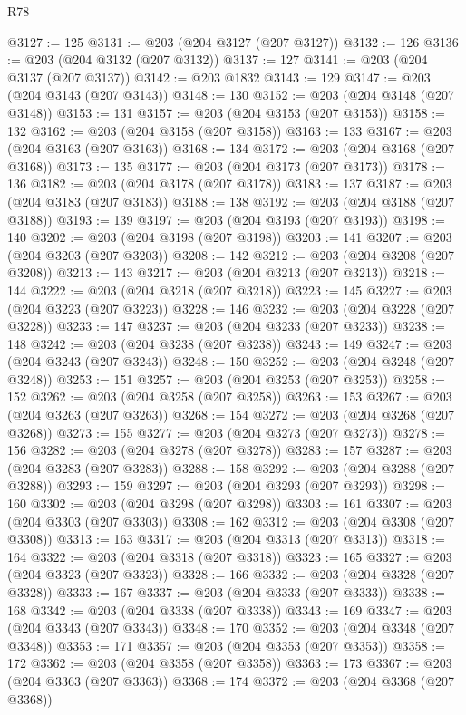 \begin{lexlean}{R78}
\begin{coremodule}
@3127 := 125
@3131 := @203 (@204 @3127 (@207 @3127))
@3132 := 126
@3136 := @203 (@204 @3132 (@207 @3132))
@3137 := 127
@3141 := @203 (@204 @3137 (@207 @3137))
@3142 := @203 @1832
@3143 := 129
@3147 := @203 (@204 @3143 (@207 @3143))
@3148 := 130
@3152 := @203 (@204 @3148 (@207 @3148))
@3153 := 131
@3157 := @203 (@204 @3153 (@207 @3153))
@3158 := 132
@3162 := @203 (@204 @3158 (@207 @3158))
@3163 := 133
@3167 := @203 (@204 @3163 (@207 @3163))
@3168 := 134
@3172 := @203 (@204 @3168 (@207 @3168))
@3173 := 135
@3177 := @203 (@204 @3173 (@207 @3173))
@3178 := 136
@3182 := @203 (@204 @3178 (@207 @3178))
@3183 := 137
@3187 := @203 (@204 @3183 (@207 @3183))
@3188 := 138
@3192 := @203 (@204 @3188 (@207 @3188))
@3193 := 139
@3197 := @203 (@204 @3193 (@207 @3193))
@3198 := 140
@3202 := @203 (@204 @3198 (@207 @3198))
@3203 := 141
@3207 := @203 (@204 @3203 (@207 @3203))
@3208 := 142
@3212 := @203 (@204 @3208 (@207 @3208))
@3213 := 143
@3217 := @203 (@204 @3213 (@207 @3213))
@3218 := 144
@3222 := @203 (@204 @3218 (@207 @3218))
@3223 := 145
@3227 := @203 (@204 @3223 (@207 @3223))
@3228 := 146
@3232 := @203 (@204 @3228 (@207 @3228))
@3233 := 147
@3237 := @203 (@204 @3233 (@207 @3233))
@3238 := 148
@3242 := @203 (@204 @3238 (@207 @3238))
@3243 := 149
@3247 := @203 (@204 @3243 (@207 @3243))
@3248 := 150
@3252 := @203 (@204 @3248 (@207 @3248))
@3253 := 151
@3257 := @203 (@204 @3253 (@207 @3253))
@3258 := 152
@3262 := @203 (@204 @3258 (@207 @3258))
@3263 := 153
@3267 := @203 (@204 @3263 (@207 @3263))
@3268 := 154
@3272 := @203 (@204 @3268 (@207 @3268))
@3273 := 155
@3277 := @203 (@204 @3273 (@207 @3273))
@3278 := 156
@3282 := @203 (@204 @3278 (@207 @3278))
@3283 := 157
@3287 := @203 (@204 @3283 (@207 @3283))
@3288 := 158
@3292 := @203 (@204 @3288 (@207 @3288))
@3293 := 159
@3297 := @203 (@204 @3293 (@207 @3293))
@3298 := 160
@3302 := @203 (@204 @3298 (@207 @3298))
@3303 := 161
@3307 := @203 (@204 @3303 (@207 @3303))
@3308 := 162
@3312 := @203 (@204 @3308 (@207 @3308))
@3313 := 163
@3317 := @203 (@204 @3313 (@207 @3313))
@3318 := 164
@3322 := @203 (@204 @3318 (@207 @3318))
@3323 := 165
@3327 := @203 (@204 @3323 (@207 @3323))
@3328 := 166
@3332 := @203 (@204 @3328 (@207 @3328))
@3333 := 167
@3337 := @203 (@204 @3333 (@207 @3333))
@3338 := 168
@3342 := @203 (@204 @3338 (@207 @3338))
@3343 := 169
@3347 := @203 (@204 @3343 (@207 @3343))
@3348 := 170
@3352 := @203 (@204 @3348 (@207 @3348))
@3353 := 171
@3357 := @203 (@204 @3353 (@207 @3353))
@3358 := 172
@3362 := @203 (@204 @3358 (@207 @3358))
@3363 := 173
@3367 := @203 (@204 @3363 (@207 @3363))
@3368 := 174
@3372 := @203 (@204 @3368 (@207 @3368))

\end{coremodule}
\end{lexlean}
